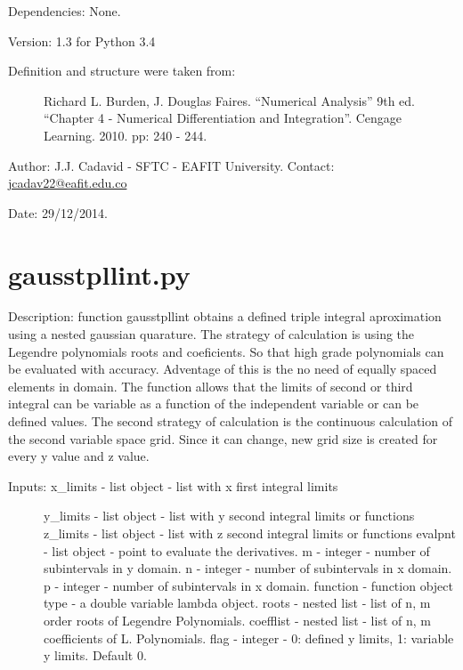 \documentclass[letterpaper,10pt,oneside]{sphinxmanual}
\theoremstyle{plain}%
\theoremstyle{definition}%
\theoremstyle{remark}%
\begin{document}
Dependencies: None.

Version: 1.3 for Python 3.4
\begin{description}
\item[{Definition and structure were taken from:}] \leavevmode
Richard L. Burden, J. Douglas Faires. ``Numerical Analysis'' 9th ed.
``Chapter 4 - Numerical Differentiation and Integration''. 
Cengage Learning. 2010. pp: 240 - 244.

\end{description}

Author: J.J. Cadavid - SFTC - EAFIT University.
Contact: \href{mailto:jcadav22@eafit.edu.co}{jcadav22@eafit.edu.co}

Date: 29/12/2014.


\section{gausstpllint.py}
\label{code:module-gausstpllint}\label{code:gausstpllint-py}
Description: function gausstpllint obtains a defined triple integral 
aproximation using a nested gaussian quarature. The strategy of calculation
is using the Legendre polynomials roots and coeficients. So that high grade 
polynomials can be evaluated with accuracy. Adventage of this is the no need
of equally spaced elements in domain. The function allows that the limits of 
second or third integral can be variable as a function of the independent 
variable or can be defined values. The second strategy of calculation is 
the continuous calculation of the second variable space grid. Since it can 
change, new grid size is created for every y value and z value.
\begin{description}
\item[{Inputs: x\_limits - list object - list with x first integral limits}] \leavevmode
y\_limits - list object - list with y second integral limits or functions
z\_limits - list object - list with z second integral limits or functions
evalpnt - list object - point to evaluate the derivatives.
m - integer - number of subintervals in y domain.
n - integer - number of subintervals in x domain.
p - integer - number of subintervals in x domain.
function - function object type - a double variable lambda object.
roots - nested list - list of n, m order roots of Legendre Polynomials.
coefflist - nested list - list of n, m coefficients of L. Polynomials.
flag - integer - 0: defined y limits, 1: variable y limits. Default 0.

\end{description}
\end{document}
